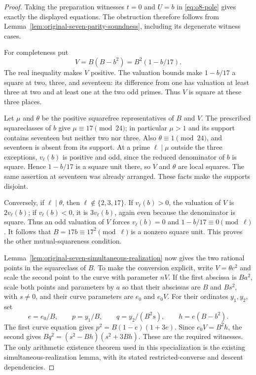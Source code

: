 \documentclass[11pt]{article}
\theoremstyle{definition}
\theoremstyle{remark}
\begin{document}
\begin{proof}
Taking the preparation witnesses $t=0$ and $U=b$ in
\eqref{eq:o8-pole} gives exactly the displayed equations.
The obstruction therefore follows from
Lemma~\ref{lem:original-seven-parity-soundness}, including its
degenerate witness cases.

For completeness put
\[
 V=B(B-b^2)=B^2(1-b/17).
\]
The real inequality makes $V$ positive. The valuation bounds make
$1-b/17$ a square at two, three, and seventeen: its difference
from one has valuation at least three at two and at least one
at the two odd primes. Thus $V$ is square at these three places.

Let $\mu$ and $\theta$ be the positive squarefree representatives
of $B$ and $V$. The prescribed squareclasses of $b$ give
$\mu\equiv17\pmod{24}$; in particular $\mu>1$ and its support
contains seventeen but neither two nor three. Also
$\theta\equiv1\pmod{24}$, and seventeen is absent from its
support. At a prime $\ell\mid\mu$ outside the three exceptions,
$v_\ell(b)$ is positive and odd, since the reduced denominator
of $b$ is square. Hence $1-b/17$ is a square unit there, so $V$
and $\theta$ are local squares. The same assertion at seventeen
was already arranged. These facts make the supports disjoint.

Conversely, if $\ell\mid\theta$, then
$\ell\notin\{2,3,17\}$. If $v_\ell(b)>0$, the valuation
of $V$ is $2v_\ell(b)$; if $v_\ell(b)<0$, it is
$3v_\ell(b)$, again even because the denominator is square.
Thus an odd valuation of $V$ forces $v_\ell(b)=0$ and
$1-b/17\equiv0\pmod\ell$. It follows that
$B=17b\equiv17^2\pmod\ell$ is a nonzero square unit.
This proves the other mutual-squareness condition.

Lemma~\ref{lem:original-seven-simultaneous-realization} now gives
the two rational points in the squareclass of $B$. To make the
conversion explicit, write $V=\theta c^2$ and scale the second
point to the curve with parameter $nV$. If the first abscissa is
$Ba^2$, scale both points and parameters by $a$ so that their
abscissas are $B$ and $Bs^2$, with $s\ne0$, and their curve
parameters are $e_0$ and $e_0V$. For their ordinates $y_1,y_2$, set
\[
 e=e_0/B,\qquad p=y_1/B,\qquad q=y_2/(B^2s),\qquad
 h=e(B-b^2).
\]
The first curve equation gives $p^2=B(1-e)(1+3e)$.
Since $e_0V=B^2h$, the second gives
$Bq^2=(s^2-Bh)(s^2+3Bh)$. These are the required witnesses.
The only arithmetic existence theorem used in this specialization
is the existing simultaneous-realization lemma, with its stated
restricted-converse and descent dependencies.
\end{proof}
\end{document}
